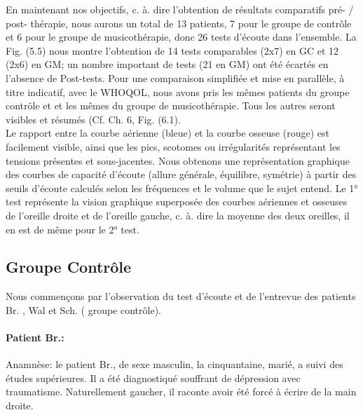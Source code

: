 En maintenant nos objectifs, c. à. dire l'obtention de  résultats comparatifs pré- / post- thé\-ra\-pie,  
nous 
aurons un total de 13 patients, 7 pour le groupe de contrôle 
et 
6 pour 
le groupe de musicothérapie, donc 26 tests d'écoute dans l'ensemble.
 La Fig. (5.5) nous montre l'obtention de 14 tests comparables (2x7) en GC et 12 (2x6) 
 en GM;
 un nombre important de tests (21 en GM) ont été 
 écartés en l'absence de Post-tests. 
 Pour une comparaison simplifiée et mise en parallèle, à titre indicatif, avec le WHOQOL, nous avons pris 
 les mêmes   
 patients du groupe contrôle  et et les mêmes du groupe de musicothérapie. Tous les autres seront 
 visibles et résumés (Cf. Ch. 6, Fig. (6.1).
 \\
 Le rapport entre la courbe aérienne (bleue) et la courbe osseuse (rouge) est facilement visible, ainsi que 
 les pics, scotomes ou irrégularités représentant les tensions présentes et sous-jacentes.
 Nous obtenons une
 représentation graphique des courbes de capacité d'écoute
 (allure générale, équilibre, symétrie) à partir des seuils d'écoute
 calculés selon les fréquences et le volume que le sujet entend.
 Le 1° test représente la vision graphique superposée des courbes aériennes et osseuses de l'oreille 
 droite et de l'oreille gauche, c. à. dire la moyenne des deux oreilles, il en est de même pour le 2° test. 
 
 \subsection{Groupe Contrôle }
  Nous commençons par l'observation du  test d'écoute et de l'entrevue  des patients Br. , Wal et Sch. ( 
  groupe contrôle).
  \paragraph{ Patient Br.:}
  Anamnèse: le patient Br., de sexe masculin, la cinquantaine, marié, a suivi des études 
  supérieures. Il a été 
  diagnostiqué souffrant de dépression avec 
  traumatisme.  Naturellement gaucher, il raconte avoir été forcé à écrire de la main droite.
   
